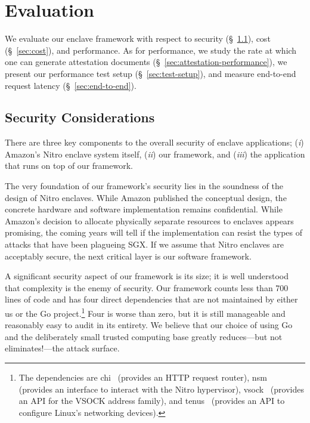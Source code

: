 \section{Evaluation}
\label{sec:evaluation}

We evaluate our enclave framework with respect to security
(\S~\ref{sec:security}), cost (\S~\ref{sec:cost}), and performance.  As for
performance, we study the rate at which one can generate attestation documents
(\S~\ref{sec:attestation-performance}), we present our performance test setup
(\S~\ref{sec:test-setup}), and measure end-to-end request latency
(\S~\ref{sec:end-to-end}).

\subsection{Security Considerations}
\label{sec:security}

There are three key components to the overall security of enclave applications;
(\emph{i}) Amazon's Nitro enclave system itself, (\emph{ii}) our framework, and
(\emph{iii}) the application that runs on top of our framework.

The very foundation of our framework's security lies in the soundness of the
design of Nitro enclaves.  While Amazon published the conceptual design, the
concrete hardware and software implementation remains confidential.  While
Amazon's decision to allocate physically separate resources to enclaves appears
promising, the coming years will tell if the implementation can resist the types
of attacks that have been plagueing SGX.  If we assume that Nitro enclaves are
acceptably secure, the next critical layer is our software framework.

A significant security aspect of our framework is its size; it is well
understood that complexity is the enemy of security.  Our framework counts less
than 700 lines of code and has four direct dependencies that are not maintained
by either us or the Go project.\footnote{The dependencies are chi~\cite{chi}
(provides an HTTP request router), nsm~\cite{nsm} (provides an interface to
interact with the Nitro hypervisor), vsock~\cite{vsock} (provides an API for the
VSOCK address family), and tenus~\cite{tenus} (provides an API to configure
Linux's networking devices).} Four is worse than zero, but it is still
manageable and reasonably easy to audit in its entirety.  We believe that our
choice of using Go and the deliberately small trusted computing base greatly
reduces---but not eliminates!---the attack surface.

